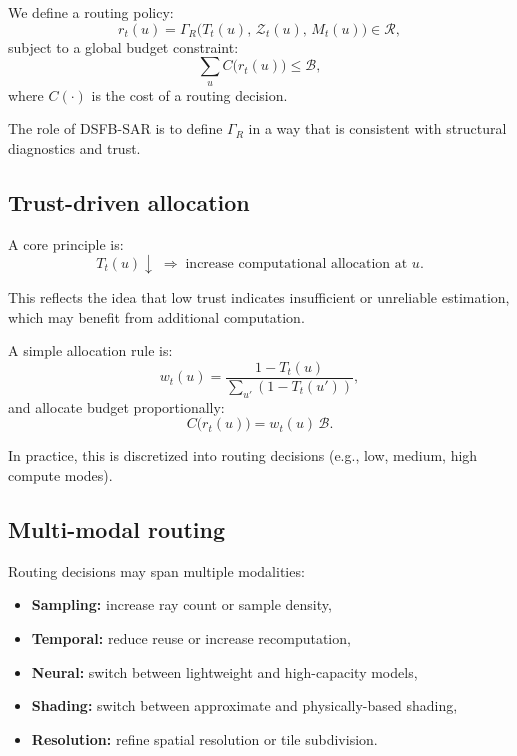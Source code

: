 \documentclass[11pt]{article}
\theoremstyle{definition}
\theoremstyle{plain}
\begin{document}
We define a routing policy:
\begin{equation}
r_t(u)=\Gamma_R\!\bigl(T_t(u),\,\mathcal{Z}_t(u),\,M_t(u)\bigr)\in\mathcal{R},
\end{equation}
subject to a global budget constraint:
\begin{equation}
\sum_{u} C\bigl(r_t(u)\bigr) \le \mathcal{B},
\end{equation}
where $C(\cdot)$ is the cost of a routing decision.

The role of DSFB-SAR is to define $\Gamma_R$ in a way that is consistent with structural diagnostics and trust.


\subsection{Trust-driven allocation}

A core principle is:
\begin{equation}
T_t(u)\downarrow \;\Rightarrow\; \text{increase computational allocation at }u.
\end{equation}

This reflects the idea that low trust indicates insufficient or unreliable estimation, which may benefit from additional computation.

A simple allocation rule is:
\begin{equation}
w_t(u)=\frac{1 - T_t(u)}{\sum_{u'} (1 - T_t(u'))},
\end{equation}
and allocate budget proportionally:
\begin{equation}
C\bigl(r_t(u)\bigr)=w_t(u)\,\mathcal{B}.
\end{equation}

In practice, this is discretized into routing decisions (e.g., low, medium, high compute modes).


\subsection{Multi-modal routing}

Routing decisions may span multiple modalities:
\begin{itemize}[leftmargin=1.5em]
    \item \textbf{Sampling:} increase ray count or sample density,
    \item \textbf{Temporal:} reduce reuse or increase recomputation,
    \item \textbf{Neural:} switch between lightweight and high-capacity models,
    \item \textbf{Shading:} switch between approximate and physically-based shading,
    \item \textbf{Resolution:} refine spatial resolution or tile subdivision.
\end{itemize}
\end{document}
